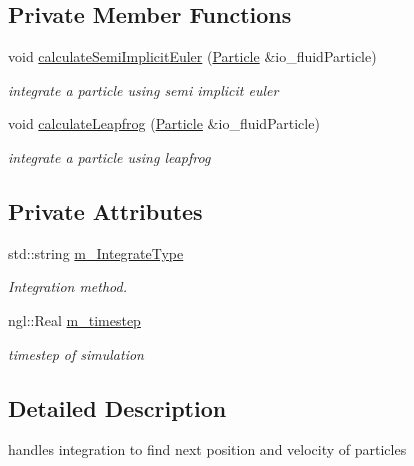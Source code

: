 \subsection*{Private Member Functions}
\begin{DoxyCompactItemize}
\item 
void \hyperlink{class_integrate_ae9b7697b3cf896e6db63fc9653846591}{calculateSemiImplicitEuler} (\hyperlink{class_particle}{Particle} \&io\_\-fluidParticle)
\begin{DoxyCompactList}\small\item\em integrate a particle using semi implicit euler \item\end{DoxyCompactList}\item 
void \hyperlink{class_integrate_aec359fd96ecbce78f7fb042798402665}{calculateLeapfrog} (\hyperlink{class_particle}{Particle} \&io\_\-fluidParticle)
\begin{DoxyCompactList}\small\item\em integrate a particle using leapfrog \item\end{DoxyCompactList}\end{DoxyCompactItemize}
\subsection*{Private Attributes}
\begin{DoxyCompactItemize}
\item 
std::string \hyperlink{class_integrate_a098af16c9cf3d1c59a771f3e39c6d534}{m\_\-IntegrateType}
\begin{DoxyCompactList}\small\item\em Integration method. \item\end{DoxyCompactList}\item 
ngl::Real \hyperlink{class_integrate_a2d8b50d0e8ae35985925e0f636215aee}{m\_\-timestep}
\begin{DoxyCompactList}\small\item\em timestep of simulation \item\end{DoxyCompactList}\end{DoxyCompactItemize}


\subsection{Detailed Description}
handles integration to find next position and velocity of particles 

